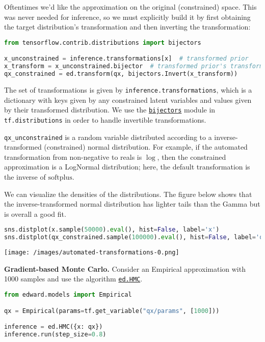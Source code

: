 Oftentimes we'd like the approximation on the original (constrained)
space. This was never needed for inference, so we must explicitly
build it by first obtaining the target distribution's transformation
and then inverting the transformation:

\begin{lstlisting}[language=Python]
from tensorflow.contrib.distributions import bijectors

x_unconstrained = inference.transformations[x]  # transformed prior
x_transform = x_unconstrained.bijector  # transformed prior's transformation
qx_constrained = ed.transform(qx, bijectors.Invert(x_transform))
\end{lstlisting}

The set of transformations is given by
\texttt{inference.transformations}, which is a dictionary with keys
given by any constrained latent variables and values given by their
transformed distribution. We use the
\href{https://www.tensorflow.org/versions/master/api_docs/python/tf/distributions/bijectors}{\texttt{bijectors}}
module in \texttt{tf.distributions} in order to handle invertible
transformations.

\texttt{qx\_unconstrained} is a random variable distributed
according to a inverse-transformed (constrained) normal distribution.
For example, if the automated transformation from non-negative to
reals is $\log$, then the constrained approximation is a LogNormal
distribution; here, the default transformation is the inverse of
$\textrm{softplus}$.

We can visualize the densities of the distributions.
The figure below shows that the inverse-transformed normal
distribution has lighter tails than the Gamma but is overall a
good fit.

\begin{lstlisting}[language=Python]
sns.distplot(x.sample(50000).eval(), hist=False, label='x')
sns.distplot(qx_constrained.sample(100000).eval(), hist=False, label='qx')
\end{lstlisting}

\texttt{[image: /images/automated-transformations-0.png]}

\textbf{Gradient-based Monte Carlo.}
Consider an Empirical approximation with 1000 samples
and use the algorithm \href{/api/ed/HMC}{\texttt{ed.HMC}}.

\begin{lstlisting}[language=Python]
from edward.models import Empirical

qx = Empirical(params=tf.get_variable("qx/params", [1000]))

inference = ed.HMC({x: qx})
inference.run(step_size=0.8)
\end{lstlisting}


